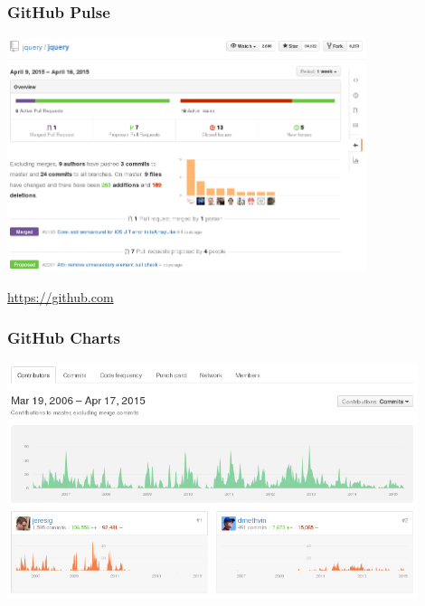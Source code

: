 \begin{frame}
\frametitle{GitHub Pulse}

\begin{center}
\includegraphics[width=10.5cm]{figs/analisis-github}
\end{center}

\begin{flushright}
\url{https://github.com}
\end{flushright}

\end{frame}

\begin{frame}
\frametitle{GitHub Charts}

\begin{center}
\includegraphics[width=12cm]{figs/analisis-github-2}
\end{center}

\end{frame}
